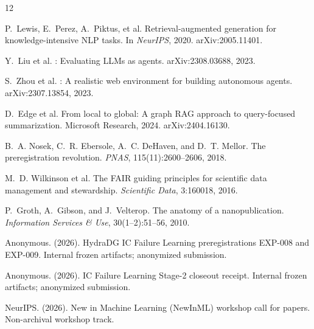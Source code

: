 \documentclass{article}
\begin{document}
\begin{thebibliography}{12}

P.~Lewis, E.~Perez, A.~Piktus, et al.
\newblock Retrieval-augmented generation for knowledge-intensive {NLP} tasks.
\newblock In \emph{NeurIPS}, 2020.
\newblock arXiv:2005.11401.

Y.~Liu et al.
: Evaluating {LLMs} as agents.
\newblock arXiv:2308.03688, 2023.

S.~Zhou et al.
: A realistic web environment for building autonomous agents.
\newblock arXiv:2307.13854, 2023.

D.~Edge et al.
\newblock From local to global: A graph {RAG} approach to query-focused summarization.
\newblock Microsoft Research, 2024.
\newblock arXiv:2404.16130.

B.~A. Nosek, C.~R. Ebersole, A.~C. DeHaven, and D.~T. Mellor.
\newblock The preregistration revolution.
\newblock \emph{PNAS}, 115(11):2600--2606, 2018.

M.~D. Wilkinson et al.
\newblock The {FAIR} guiding principles for scientific data management and stewardship.
\newblock \emph{Scientific Data}, 3:160018, 2016.

P.~Groth, A.~Gibson, and J.~Velterop.
\newblock The anatomy of a nanopublication.
\newblock \emph{Information Services \& Use}, 30(1--2):51--56, 2010.

Anonymous. (2026). HydraDG IC Failure Learning preregistrations EXP-008 and EXP-009. Internal frozen artifacts; anonymized submission.

Anonymous. (2026). IC Failure Learning Stage-2 closeout receipt. Internal frozen artifacts; anonymized submission.

NeurIPS. (2026). New in Machine Learning (NewInML) workshop call for papers. Non-archival workshop track.

\end{thebibliography}
\end{document}
